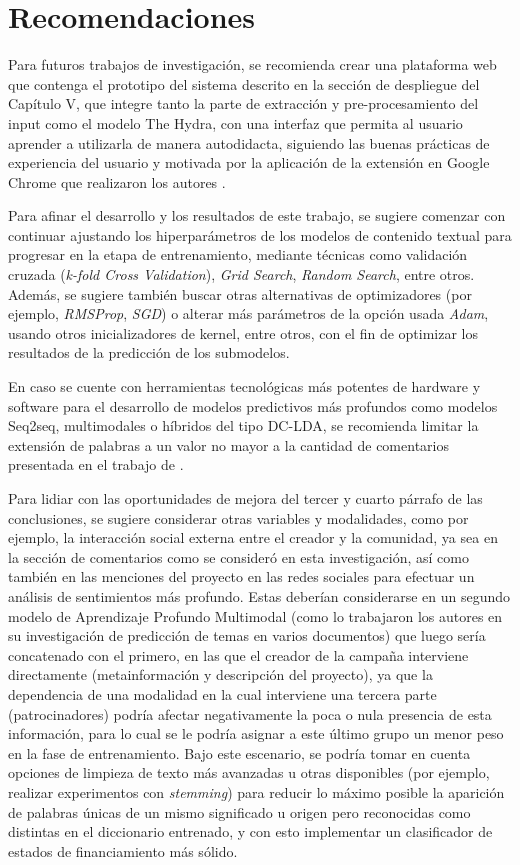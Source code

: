\section{Recomendaciones}
Para futuros trabajos de investigación, se recomienda crear una plataforma web que contenga el prototipo del sistema descrito en la sección de despliegue del Capítulo V, que integre tanto la parte de extracción y pre-procesamiento del input como el modelo The Hydra, con una interfaz que permita al usuario aprender a utilizarla de manera autodidacta, siguiendo las buenas prácticas de experiencia del usuario y motivada por la aplicación de la extensión en Google Chrome que realizaron los autores \cite{pr_chen2013kickpredict}.

Para afinar el desarrollo y los resultados de este trabajo, se sugiere comenzar con continuar ajustando los hiperparámetros de los modelos de contenido textual para progresar en la etapa de entrenamiento, mediante técnicas como validación cruzada (\textit{k-fold Cross Validation}), \textit{Grid Search}, \textit{Random Search}, entre otros. Además, se sugiere también buscar otras alternativas de optimizadores (por ejemplo, \textit{RMSProp}, \textit{SGD}) o alterar más parámetros de la opción usada \textit{Adam}, usando otros inicializadores de kernel, entre otros, con el fin de optimizar los resultados de la predicción de los submodelos.

En caso se cuente con herramientas tecnológicas más potentes de hardware y software para el desarrollo de modelos predictivos más profundos como modelos Seq2seq, multimodales o híbridos del tipo DC-LDA, se recomienda limitar la extensión de palabras a un valor no mayor a la cantidad de comentarios presentada en el trabajo de \cite{pr_shafqat2019topicpredictions}.

Para lidiar con las oportunidades de mejora del tercer y cuarto párrafo de las conclusiones, se sugiere considerar otras variables y modalidades, como por ejemplo, la interacción social externa entre el creador y la comunidad, ya sea en la sección de comentarios como se consideró en esta investigación, así como también en las menciones del proyecto en las redes sociales para efectuar un análisis de sentimientos más profundo. Estas deberían considerarse en un segundo modelo de Aprendizaje Profundo Multimodal (como lo trabajaron los autores \cite{pr_shafqat2019topicpredictions} en su investigación de predicción de temas en varios documentos) que luego sería concatenado con el primero, en las que el creador de la campaña interviene directamente (metainformación y descripción del proyecto), ya que la dependencia de una modalidad en la cual interviene una tercera parte (patrocinadores) podría afectar negativamente la poca o nula presencia de esta información, para lo cual se le podría asignar a este último grupo un menor peso en la fase de entrenamiento. Bajo este escenario, se podría tomar en cuenta opciones de limpieza de texto más avanzadas u otras disponibles (por ejemplo, realizar experimentos con \textit{stemming}) para reducir lo máximo posible la aparición de palabras únicas de un mismo significado u origen pero reconocidas como distintas en el diccionario entrenado, y con esto implementar un clasificador de estados de financiamiento más sólido.

